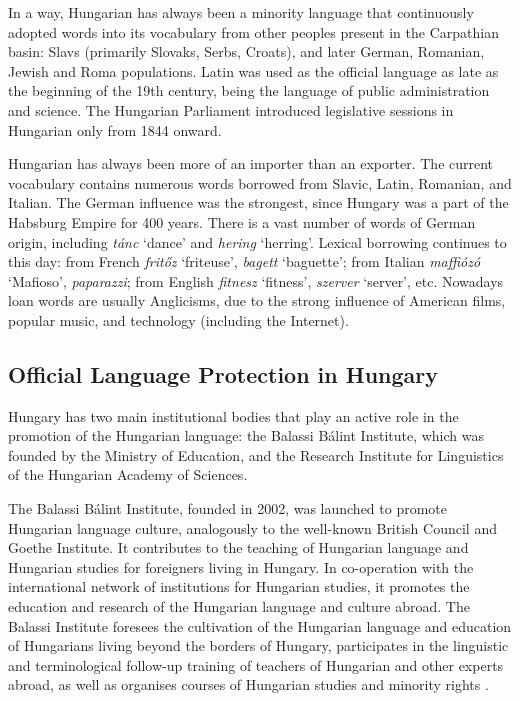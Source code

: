 \begin{multicols}{2}
In a way, Hungarian has always been a minority language that continuously adopted words into its vocabulary from other peoples present in the Carpathian basin: Slavs (primarily Slovaks, Serbs, Croats), and later German, Romanian, Jewish and Roma populations. Latin was used as the official language as late as the beginning of the 19th century, being the language of public administration and science. The Hungarian Parliament introduced legislative sessions in Hungarian only from 1844 onward.

Hungarian has always been more of an importer than an exporter. The current vocabulary contains numerous words borrowed from Slavic, Latin, Romanian, and Italian. The German influence was the strongest, since Hungary was a part of the Habsburg Empire for 400 years. There is a vast number of words of German origin, including \textit{tánc} `dance' and \textit{hering} `herring'. Lexical borrowing continues to this day: from French \textit{fritőz} `friteuse', \textit{bagett} `baguette'; from Italian \textit{maffiózó} `Mafioso', \textit{paparazzi}; from English \textit{fitnesz} `fitness', \textit{szerver} `server', etc. Nowadays loan words are usually Anglicisms, due to the strong influence of American films, popular music, and technology (including the Internet). 

\subsection{Official Language Protection in Hungary}

Hungary has two main institutional bodies that play an active role in the promotion of the Hungarian language: the Balassi Bálint Institute, which was founded by the Ministry of Education, and  the Research Institute for Linguistics of the Hungarian Academy of Sciences. 


The Balassi Bálint Institute, founded in 2002, was launched to promote Hungarian language culture, analogously to the well-known British Council and Goethe Institute. It contributes to the teaching of Hungarian language and Hungarian studies for foreigners living in Hungary. In co-operation with the international network of institutions for Hungarian studies, it promotes the education and research of the Hungarian language and culture abroad.  The Balassi Institute foresees the cultivation of the Hungarian language and education of Hungarians living beyond the borders of Hungary, participates in the linguistic and terminological follow-up training of teachers of Hungarian and other experts abroad, as well as organises courses of Hungarian studies and minority rights \cite{bbi}. 


\end{multicols}

